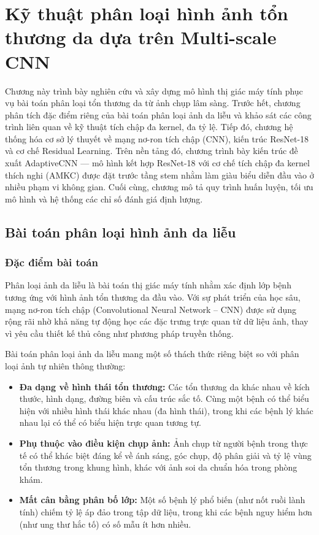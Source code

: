 \chapter[\MakeUppercase{Kỹ thuật phân loại hình ảnh tổn thương da dựa trên Multi-scale CNN}]{Kỹ thuật phân loại hình ảnh tổn thương da dựa trên Multi-scale CNN}
\label{ch:chuong2}

Chương này trình bày nghiên cứu và xây dựng mô hình thị giác máy tính phục vụ bài toán phân loại tổn thương da từ ảnh chụp lâm sàng. Trước hết, chương phân tích đặc điểm riêng của bài toán phân loại ảnh da liễu và khảo sát các công trình liên quan về kỹ thuật tích chập đa kernel, đa tỷ lệ. Tiếp đó, chương hệ thống hóa cơ sở lý thuyết về mạng nơ-ron tích chập (CNN), kiến trúc ResNet-18 và cơ chế Residual Learning. Trên nền tảng đó, chương trình bày kiến trúc đề xuất AdaptiveCNN --- mô hình kết hợp ResNet-18 với cơ chế tích chập đa kernel thích nghi (AMKC) được đặt trước tầng stem nhằm làm giàu biểu diễn đầu vào ở nhiều phạm vi không gian. Cuối cùng, chương mô tả quy trình huấn luyện, tối ưu mô hình và hệ thống các chỉ số đánh giá định lượng.

\section{Bài toán phân loại hình ảnh da liễu}

\subsection{Đặc điểm bài toán}

Phân loại ảnh da liễu là bài toán thị giác máy tính nhằm xác định lớp bệnh tương ứng với hình ảnh tổn thương da đầu vào. Với sự phát triển của học sâu, mạng nơ-ron tích chập (Convolutional Neural Network -- CNN) được sử dụng rộng rãi nhờ khả năng tự động học các đặc trưng trực quan từ dữ liệu ảnh, thay vì yêu cầu thiết kế thủ công như phương pháp truyền thống.

Bài toán phân loại ảnh da liễu mang một số thách thức riêng biệt so với phân loại ảnh tự nhiên thông thường:
\begin{itemize}
  \item \textbf{Đa dạng về hình thái tổn thương:} Các tổn thương da khác nhau về kích thước, hình dạng, đường biên và cấu trúc sắc tố. Cùng một bệnh có thể biểu hiện với nhiều hình thái khác nhau (đa hình thái), trong khi các bệnh lý khác nhau lại có thể có biểu hiện trực quan tương tự.
  \item \textbf{Phụ thuộc vào điều kiện chụp ảnh:} Ảnh chụp từ người bệnh trong thực tế có thể khác biệt đáng kể về ánh sáng, góc chụp, độ phân giải và tỷ lệ vùng tổn thương trong khung hình, khác với ảnh soi da chuẩn hóa trong phòng khám.
  \item \textbf{Mất cân bằng phân bố lớp:} Một số bệnh lý phổ biến (như nốt ruồi lành tính) chiếm tỷ lệ áp đảo trong tập dữ liệu, trong khi các bệnh nguy hiểm hơn (như ung thư hắc tố) có số mẫu ít hơn nhiều.
\end{itemize}

